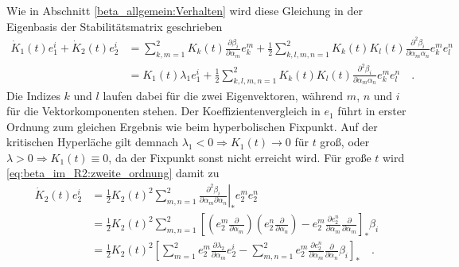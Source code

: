     Wie in Abschnitt \ref{beta_allgemein:Verhalten} wird diese Gleichung in 
    der Eigenbasis der Stabilitätsmatrix geschrieben
    \begin{align}
     \dot{K}_1 (t) e_1^i +\dot{K}_2(t) e_2^i &= \sum\limits_{k,m=1}^2
     K_k(t) \frac{\partial \beta _i}{\partial \alpha_m} e_k^m 
     + \frac12 \sum\limits_{k,l,m,n=1}^2
     K_k(t)K_l(t)\frac{\partial^2 \beta _i}{\partial \alpha_m \alpha_n}e_k^m  
     e_l^n \\
     &= K_1(t)\lambda_1 e_1^i  + \frac12 \sum\limits_{k,l,m,n=1}^2
     K_k(t)K_l(t)\frac{\partial^2 \beta _i}{\partial \alpha_m \alpha_n}e_k^m  
     e_l^n 
     \quad . \label{eq:beta_im_R2:zweite_ordnung}
    \end{align}
    Die Indizes $k$ und $l$ laufen dabei für die zwei Eigenvektoren, während 
    $m$, $n$ und $i$ für die Vektorkomponenten stehen. Der 
    Koeffizientenvergleich in $e_1$ führt in erster Ordnung zum gleichen 
    Ergebnis wie beim hyperbolischen Fixpunkt. Auf der kritischen Hyperläche 
    gilt demnach $\lambda_1<0 \Rightarrow K_1(t)\rightarrow 0$ für $t$ groß, 
    oder $\lambda>0 \Rightarrow K_1(t)\equiv 0$, da der Fixpunkt sonst nicht 
    erreicht wird. Für große $t$ wird \eqref{eq:beta_im_R2:zweite_ordnung} 
    damit zu 
    \begin{align}
     \dot{K}_2(t) e_2^i &= \frac{1}{2} K_2(t)^2 \sum\limits_{m,n=1}^2 
     \left.\frac{\partial^2 \beta_i}{\partial \alpha_m \partial \alpha_n}
     \right|_* e_2^m e_2^n
     \\&= \frac12 K_2(t)^2 \sum\limits_{m,n=1}^2 \left[ \left(e_2^m 
     \frac{\partial}{\partial \alpha_m} \right) 
     \left(e_2^n \frac{\partial}{\partial \alpha_n} \right) - e_2^m 
     \frac{\partial e_2^n}{\partial \alpha_m} \frac{\partial}{\partial \alpha_m}
     \right]_* \beta_i \\
     &= \frac12 K_2(t)^2 \left[ \sum\limits_{m=1}^2 e_2^m 
     \frac{\partial\lambda_2}{\partial \alpha_m}e_2^i - \sum\limits_{m,n=1}^2 
     e_2^m \frac{\partial e_2^n}{\partial \alpha_m} 
     \frac{\partial}{\partial \alpha_n} \beta_i \right]_* \quad . 
     \label{eq:beta_im_R2:mischterm}
    \end{align}
